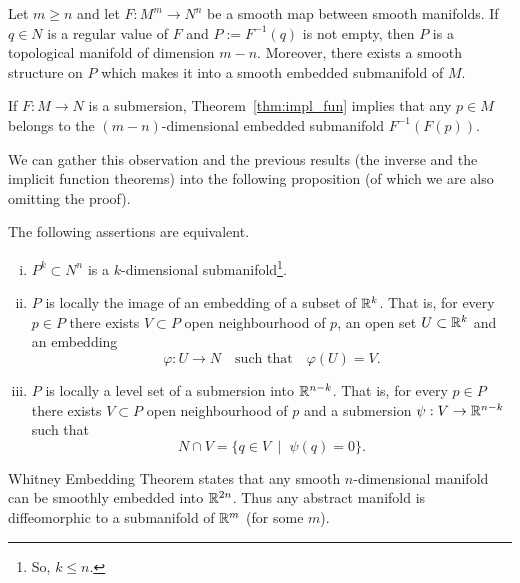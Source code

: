 \begin{theorem}\label{thm:impl_fun}
  Let $m\geq n$ and let $F: M^m \to N^n$ be a smooth map between smooth manifolds.
  If $q\in N$ is a regular value of $F$ and $P := F^{-1}(q)$ is not empty, then $P$ is a topological manifold of dimension $m-n$. 
  Moreover, there exists a smooth structure on $P$ which makes it into a smooth embedded submanifold of $M$.
\end{theorem}

\begin{remark}
  If $F:M\to N$ is a submersion, Theorem~\ref{thm:impl_fun} implies that any $p\in M$ belongs to the $(m-n)$-dimensional embedded submanifold $F^{-1}(F(p))$.
\end{remark}

We can gather this observation and the previous results (the inverse and the implicit function theorems) into the following proposition (of which we are also omitting the proof).

\begin{proposition}\label{prop:submanifolds_and_R}
  The following assertions are equivalent.
  \begin{enumerate}[(i)]
    \item $P^k\subset N^n$ is a $k$-dimensional submanifold\footnote{So, $k \leq n$.}.
    \item $P$ is locally the image of an embedding of a subset of $\mathbb{R}^k$.
    That is, for every $p\in P$ there exists $V\subset P$ open neighbourhood of $p$, an open set $U\subset\mathbb{R}^k$ and an embedding
    \begin{equation}
      \varphi : U \to N \quad\mbox{such that}\quad \varphi(U)=V.
    \end{equation}
    \item $P$ is locally a level set of a submersion into $\mathbb{R}^{n-k}$.
    That is, for every $p\in P$ there exists $V\subset P$ open neighbourhood of $p$ and a submersion $\psi: V \to\mathbb{R}^{n-k}$ such that
    \begin{equation}
      N\cap V = \{q\in V \;\mid\; \psi(q) = 0\}.
    \end{equation}
  \end{enumerate}
\end{proposition}

\begin{remark}\label{rmk:WhitneyET}
  Whitney Embedding Theorem states that any smooth $n$-dimensional manifold can be smoothly embedded into $\mathbb{R}^{2n}$.
  Thus any abstract manifold is diffeomorphic to a submanifold of $\mathbb{R}^m$ (for some $m$).
\end{remark}

